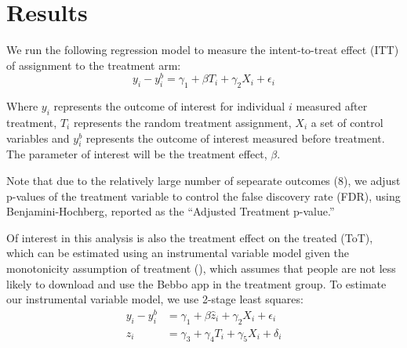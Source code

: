 \documentclass{article}
\begin{document}

% 


% 



\section{Results}

We run the following regression model to measure the intent-to-treat effect (ITT) of assignment to the treatment arm:
$$
y_{i} - y^{b}_i = \gamma_1 + \beta T_{i} + \gamma_2X_{i} + \epsilon_i
$$

Where $y_i$ represents the outcome of interest for individual $i$ measured after treatment, $T_i$ represents the random treatment assignment, $X_i$ a set of control variables and $y^b_i$ represents the outcome of interest measured before treatment. The parameter of interest will be the treatment effect, $\beta$.

Note that due to the relatively large number of sepearate outcomes (8), we adjust p-values of the treatment variable to control the false discovery rate (FDR), using Benjamini-Hochberg, reported as the ``Adjusted Treatment p-value.''

Of interest in this analysis is also the treatment effect on the treated (ToT), which can be estimated using an instrumental variable model given the monotonicity assumption of treatment (\cite{Imbens2015}), which assumes that people are not less likely to download and use the Bebbo app in the treatment group. To estimate our instrumental variable model, we use 2-stage least squares:
\begin{align*}
y_{i} - y^{b}_i &= \gamma_1 + \beta \hat{z}_{i} + \gamma_2X_{i} + \epsilon_i \\
z_{i} &= \gamma_3 + \gamma_4 T_{i} + \gamma_5X_{i} + \delta_i
\end{align*}
\end{document}
